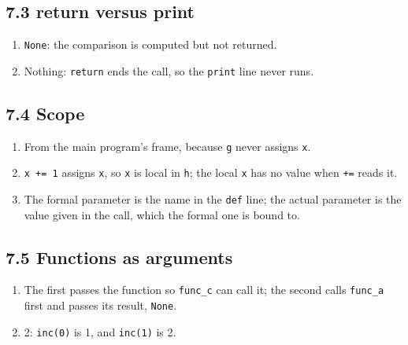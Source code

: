 \documentclass[11pt]{article}
\begin{document}
\begin{keepsection}\subsection{7.3 return versus print}

\begin{enumerate}
\item \texttt{None}: the comparison is computed but not returned.
\item Nothing: \texttt{return} ends the call, so the \texttt{print} line never runs.
\end{enumerate}

\end{keepsection}
\begin{keepsection}\subsection{7.4 Scope}

\begin{enumerate}
\item From the main program’s frame, because \texttt{g} never assigns \texttt{x}.
\item \texttt{x += 1} assigns \texttt{x}, so \texttt{x} is local in \texttt{h}; the local \texttt{x} has no value when \texttt{+=} reads it.
\item The formal parameter is the name in the \texttt{def} line; the actual parameter is the value given in the call, which the formal one is bound to.
\end{enumerate}

\end{keepsection}
\begin{keepsection}\subsection{7.5 Functions as arguments}

\begin{enumerate}
\item The first passes the function so \texttt{func\_c} can call it; the second calls \texttt{func\_a} first and passes its result, \texttt{None}.
\item 2: \texttt{inc(0)} is 1, and \texttt{inc(1)} is 2.
\end{enumerate}

\end{keepsection}
\end{document}
